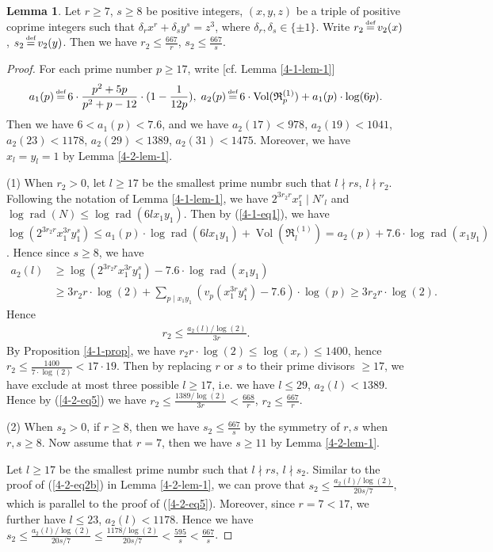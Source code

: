\documentclass[a4paper, 12pt]{article}
\DeclareMathOperator{\defeq}{\overset{\text{\tiny{def}}}{=}}
\DeclareMathOperator{\rad}{\text{rad}}
\DeclareMathOperator{\Vol}{\text{Vol}}
\numberwithin{equation}{section}
\theoremstyle{definition}
\newtheorem{lem}[thm]{Lemma}
\begin{document}
\begin{lem}  \label{4-2-lem-2}
Let $r \ge 7$, $s\ge 8$ be positive integers, $(x,y,z)$ be a triple of positive coprime integers such that $\delta_r x^r + \delta_s y^s = z^3$, where $\delta_r,\delta_s \in \{\pm 1\}$. 
Write $r_2 \defeq v_2(x)$, $s_2 \defeq v_2(y)$.  
Then we have $r_2 \le \frac{667}{r}$, $s_2 \le \frac{667}{s}$.
\end{lem}
\begin{proof}
For each prime number $p\ge 17$, write [cf. Lemma \ref{4-1-lem-1}]
\small\begin{gather*}
a_1(p) \defeq 6 \cdot \frac{p^2+5p}{p^2+p-12}\cdot (1-\frac{1}{12p}), \;
a_2(p) \defeq 6 \cdot \Vol(\mathfrak R_p^{(1)}) + a_1(p)\cdot \log(6p).
\end{gather*}\normalsize
Then we have $6 < a_1(p) < 7.6$, and we have 
$a_2(17) < 978$, $a_2(19) < 1041$, $a_2(23) < 1178$, 
$a_2(29) < 1389$, $a_2(31) < 1475$.
Moreover, we have $x_l = y_l = 1$ by Lemma \ref{4-2-lem-1}.

(1) When $r_2 > 0$, let $l \ge 17$ be the smallest prime numbr such that $l\nmid rs$, $l\nmid r_2$. 
Following the notation of Lemma \ref{4-1-lem-1}, we have $2^{3r_2r}x_1^r \mid N'_l$ and $\log\rad(N) \le \log\rad(6l x_1y_1)$.
Then by (\ref{4-1-eq1}), we have $\log(2^{3r_2r} x_1^{3r} y_1^s) \le a_1(p) \cdot \log\rad(6lx_1y_1) + \Vol(\mathfrak R_l^{(1)}) = a_2(p) + 7.6 \cdot \log\rad(x_1 y_1)$. Hence since $s\ge 8$, we have
\begin{align*}
 a_2(l)  &\ge \log(2^{3r_2r} x_1^{3r} y_1^{s} ) - 7.6 \cdot \log\rad(x_1 y_1) \\
     &\ge 3r_2r\cdot \log(2) + \sum_{p\mid x_1y_1} (v_p(x_1^{3r} y_1^{s}) - 7.6)\cdot\log(p)
     \ge  3r_2r\cdot \log(2) .
\end{align*}
Hence \begin{align} \label{4-2-eq5}
 r_2 \le \frac{a_2(l)/\log(2)}{3r} .
\end{align}
By Proposition \ref{4-1-prop}, we have $r_2r\cdot \log(2) \le \log(x_r) \le 1400$, hence $r_2 \le \frac{1400}{7\cdot \log(2)} < 17 \cdot 19$.
Then by replacing $r$ or $s$ to their prime divisors $\ge 17$, we have exclude at most three possible $l \ge 17$, i.e. we have $l\le 29$, $a_2(l) < 1389$. Hence by (\ref{4-2-eq5}) we have $r_2 \le \frac{1389/\log(2)}{3r} < \frac{668}{r}$, $r_2 \le \frac{667}{r}$.

(2) When $s_2 > 0$, if $r\ge 8$, then we have $s_2 \le \frac{667}{s}$ by the symmetry of $r,s$ when $r,s \ge 8$. 
Now assume that $r=7$, then we have $s\ge 11$ by Lemma \ref{4-2-lem-1}. 

Let $l \ge 17$ be the smallest prime numbr such that $l\nmid rs$, $l\nmid s_2$. 
Similar to the proof of (\ref{4-2-eq2b}) in Lemma \ref{4-2-lem-1}, we can prove that $s_2 \le \frac{a_2(l)/\log(2)}{20s/7}$, which is parallel to the proof of (\ref{4-2-eq5}). 
Moreover, since $r = 7 < 17$, we further have $l \le 23$, $a_2(l) < 1178$.
Hence we have $s_2 \le \frac{a_2(l)/\log(2)}{20s/7} \le \frac{1178/\log(2)}{20s/7} < \frac{595}{s} < \frac{667}{s}$.
\end{proof}
\end{document}
